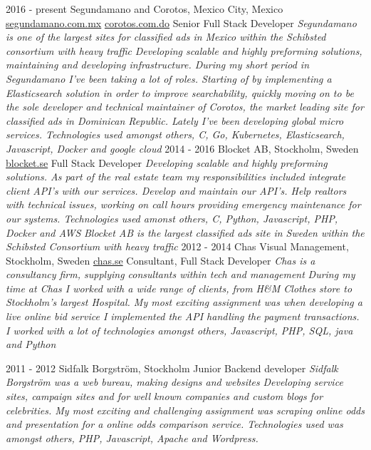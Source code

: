 \documentclass[]{friggeri-cv}
\begin{document}
\begin{entrylist}
  \bigentry
    {2016 - present}
    {Segundamano and Corotos, Mexico City, Mexico \newline 
        {\href{https://www.segundamano.com.mx/}{segundamano.com.mx}} \newline
        {\href{https://www.corotos.com.do/}{corotos.com.do}}
    }
    {Senior Full Stack Developer}
    {\textit{Segundamano is one of the largest sites for classified ads in Mexico within the Schibsted consortium with heavy traffic}}
    {\emph{Developing scalable and highly preforming solutions, maintaining and developing infrastructure. During my short period in Segundamano I've been taking a lot of roles. Starting of by implementing a Elasticsearch solution in order to improve searchability, quickly moving on to be the sole developer and technical maintainer of Corotos, the market leading site for classified ads in Dominican Republic. Lately I've been developing global micro services. Technologies used amongst others, C, Go, Kubernetes, Elasticsearch, Javascript, Docker and google cloud}}
  \bigentry
    {2014 - 2016}
    {Blocket AB, Stockholm, Sweden \newline 
        {\href{http://blocket.se}{blocket.se}}
    }
    {Full Stack Developer}
    {\textit{Developing scalable and highly preforming solutions. As part of the real estate team my
    responsibilities included integrate client API's with our services. Develop and maintain our
    API's. Help realtors with technical issues, working on call hours providing emergency
    maintenance for our systems. Technologies used amonst others, C, Python, Javascript, PHP, Docker and AWS}}
    {\emph{Blocket AB is the largest classified ads site in Sweden within the Schibsted Consortium with heavy traffic}
    }
  \bigentry
    {2012 - 2014}
    {Chas Visual Management, Stockholm, Sweden \newline 
        {\href{https://chas.se/}{chas.se}}
    }
    {Consultant, Full Stack Developer}
    {\textit{Chas is a consultancy firm, supplying consultants within tech and management}}
    {\emph{During my time at Chas I worked with a wide range of clients, from H\&M Clothes store to Stockholm's largest Hospital. My most exciting assignment was when developing a live online bid service I implemented the API handling the payment transactions. I worked with a lot of technologies amongst others, Javascript, PHP, SQL, java and Python}}
\end{entrylist}

\begin{entrylist}
  \bigentry
    {2011 - 2012}
    {Sidfalk Borgström, Stockholm}
    {Junior Backend developer}
    {\textit{Sidfalk Borgström was a web bureau, making designs and websites}}
    {\emph{Developing service sites, campaign sites and for well known companies and custom blogs for celebrities. My most exciting and challenging assignment was scraping online odds and presentation for a online odds comparison service. Technologies used was amongst others, PHP, Javascript, Apache and Wordpress.}}
\end{entrylist}
\end{document}
